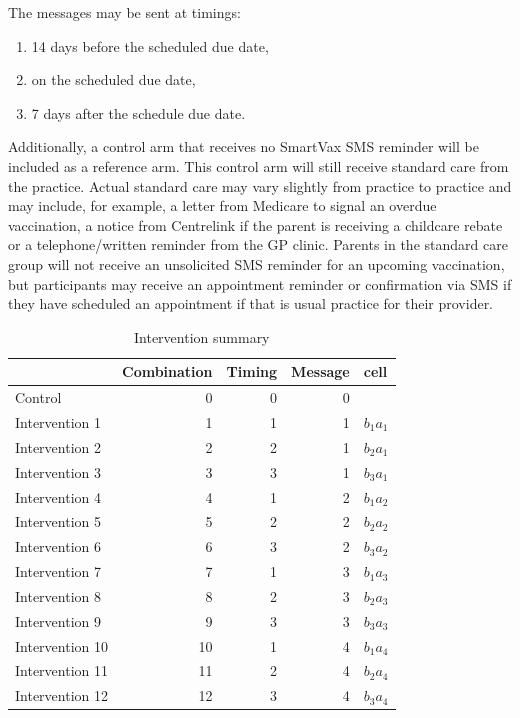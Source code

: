 \documentclass[
  bibliography=totoc]{scrreprt}
\providecommand{\tightlist}{%
  \setlength{\itemsep}{0pt}\setlength{\parskip}{0pt}}
\begin{document}
The messages may be sent at timings:

\begin{enumerate}
\def\labelenumi{\arabic{enumi}.}
\tightlist
\item
  14 days before the scheduled due date,
\item
  on the scheduled due date,
\item
  7 days after the schedule due date.
\end{enumerate}

Additionally, a control arm that receives no SmartVax SMS reminder will be included as a reference arm.
This control arm will still receive standard care from the practice.
Actual standard care may vary slightly from practice to practice and may include, for example, a letter from Medicare to signal an overdue vaccination, a notice from Centrelink if the parent is receiving a childcare rebate or a telephone/written reminder from the GP clinic.
Parents in the standard care group will not receive an unsolicited SMS reminder for an upcoming vaccination, but participants may receive an appointment reminder or confirmation via SMS if they have scheduled an appointment if that is usual practice for their provider.

\begin{table}[H]

\caption{\label{tab:intsum}Intervention summary}
\centering
\fontsize{10}{12}\selectfont
\begin{tabular}[t]{lrrrl}
\toprule
  & Combination & Timing & Message & cell\\
\midrule
Control & 0 & 0 & 0 & \\
Intervention 1 & 1 & 1 & 1 & $b_1$$a_1$\\
Intervention 2 & 2 & 2 & 1 & $b_2$$a_1$\\
Intervention 3 & 3 & 3 & 1 & $b_3$$a_1$\\
Intervention 4 & 4 & 1 & 2 & $b_1$$a_2$\\
Intervention 5 & 5 & 2 & 2 & $b_2$$a_2$\\
Intervention 6 & 6 & 3 & 2 & $b_3$$a_2$\\
Intervention 7 & 7 & 1 & 3 & $b_1$$a_3$\\
Intervention 8 & 8 & 2 & 3 & $b_2$$a_3$\\
Intervention 9 & 9 & 3 & 3 & $b_3$$a_3$\\
Intervention 10 & 10 & 1 & 4 & $b_1$$a_4$\\
Intervention 11 & 11 & 2 & 4 & $b_2$$a_4$\\
Intervention 12 & 12 & 3 & 4 & $b_3$$a_4$\\
\bottomrule
\end{tabular}
\end{table}
\end{document}
